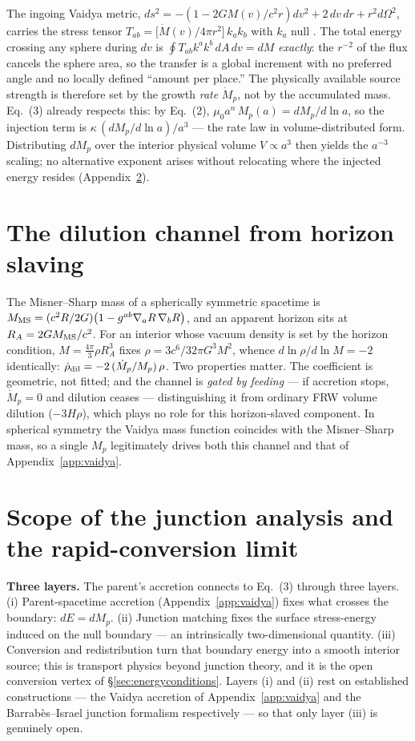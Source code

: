 \documentclass[11pt,a4paper]{article}
\begin{document}
The ingoing Vaidya metric, $ds^2=-\left(1-2GM(v)/c^2 r\right)dv^2+2\,dv\,dr+r^2 d\Omega^2$, carries the stress tensor $T_{ab}=\big[\dot M(v)/4\pi r^2\big]\,k_a k_b$ with $k_a$ null \citep{Vaidya1951}. The total energy crossing any sphere during $dv$ is $\oint T_{ab}k^a k^b\,dA\,dv = dM$ \emph{exactly}: the $r^{-2}$ of the flux cancels the sphere area, so the transfer is a global increment with no preferred angle and no locally defined ``amount per place.'' The physically available source strength is therefore set by the growth \emph{rate} $\dot M_p$, not by the accumulated mass. Eq.~(3) already respects this: by Eq.~(2), $\mu_0 a^n\,M_p(a)=dM_p/d\ln a$, so the injection term is $\kappa\,(dM_p/d\ln a)/a^3$ --- the rate law in volume-distributed form. Distributing $dM_p$ over the interior physical volume $V\propto a^3$ then yields the $a^{-3}$ scaling; no alternative exponent arises without relocating where the injected energy resides (Appendix~\ref{app:conversion}).

\section{The dilution channel from horizon slaving}\label{app:ms}

The Misner--Sharp mass \citep{MisnerSharp1964} of a spherically symmetric spacetime is $M_{\rm MS}=(c^2 R/2G)\big(1-g^{ab}\nabla_a R\,\nabla_b R\big)$, and an apparent horizon sits at $R_A=2GM_{\rm MS}/c^2$. For an interior whose vacuum density is set by the horizon condition, $M=\tfrac{4\pi}{3}\rho R_A^3$ fixes $\rho=3c^6/32\pi G^3 M^2$, whence $d\ln\rho/d\ln M=-2$ identically: $\dot\rho_{\rm dil}=-2\,(\dot M_p/M_p)\,\rho$. Two properties matter. The coefficient is geometric, not fitted; and the channel is \emph{gated by feeding} --- if accretion stops, $\dot M_p=0$ and dilution ceases --- distinguishing it from ordinary FRW volume dilution ($-3H\rho$), which plays no role for this horizon-slaved component. In spherical symmetry the Vaidya mass function coincides with the Misner--Sharp mass, so a single $M_p$ legitimately drives both this channel and that of Appendix~\ref{app:vaidya}.

\section{Scope of the junction analysis and the rapid-conversion limit}\label{app:conversion}

\textbf{Three layers.} The parent's accretion connects to Eq.~(3) through three layers. (i) Parent-spacetime accretion (Appendix~\ref{app:vaidya}) fixes what crosses the boundary: $dE=dM_p$. (ii) Junction matching \citep{Israel1966,BarrabesIsrael1991} fixes the surface stress-energy induced on the null boundary --- an intrinsically two-dimensional quantity. (iii) Conversion and redistribution turn that boundary energy into a smooth interior source; this is transport physics beyond junction theory, and it is the open conversion vertex of \S\ref{sec:energyconditions}. Layers (i) and (ii) rest on established constructions --- the Vaidya accretion of Appendix~\ref{app:vaidya} and the Barrab\`es--Israel junction formalism respectively --- so that only layer (iii) is genuinely open.
\end{document}
